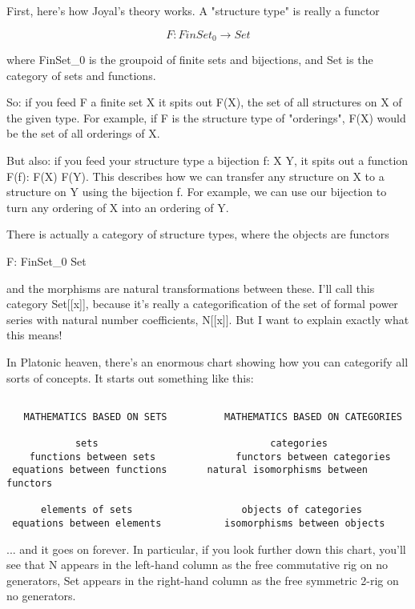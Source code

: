First, here's how Joyal's theory works.   A "structure type" is 
really a functor

$$
F: FinSet_{0} \to  Set
$$
    
where FinSet_{0} is the groupoid of finite sets and bijections,
and Set is the category of sets and functions.

So: if you feed F a finite set X it spits out F(X), the set of 
all structures on X of the given type.  For example, if F is the
structure type of "orderings", F(X) would be the set of all 
orderings of X.

But also: if you feed your structure type a bijection f: X \to  Y,
it spits out a function F(f): F(X) \to  F(Y).  This describes how
we can transfer any structure on X to a structure on Y using the
bijection f.  For example, we can use our bijection to turn any 
ordering of X into an ordering of Y.

There is actually a category of structure types, where the objects 
are functors 

F: FinSet_{0} \to  Set

and the morphisms are natural transformations between these.   I'll 
call this category Set[[x]], because it's really a categorification of 
the set of formal power series with natural number coefficients, N[[x]]. 
But I want to explain exactly what this means!

In Platonic heaven, there's an enormous chart showing how you can
categorify all sorts of concepts.  It starts out something like this:

\begin{verbatim}

   MATHEMATICS BASED ON SETS          MATHEMATICS BASED ON CATEGORIES

            sets                              categories
    functions between sets              functors between categories
 equations between functions       natural isomorphisms between functors

      elements of sets                   objects of categories
 equations between elements           isomorphisms between objects

\end{verbatim}
    
... and it goes on forever.  In particular, if you look further down
this chart, you'll see that N appears in the left-hand column as the
free commutative rig on no generators, Set appears in the right-hand
column as the free symmetric 2-rig on no generators.

